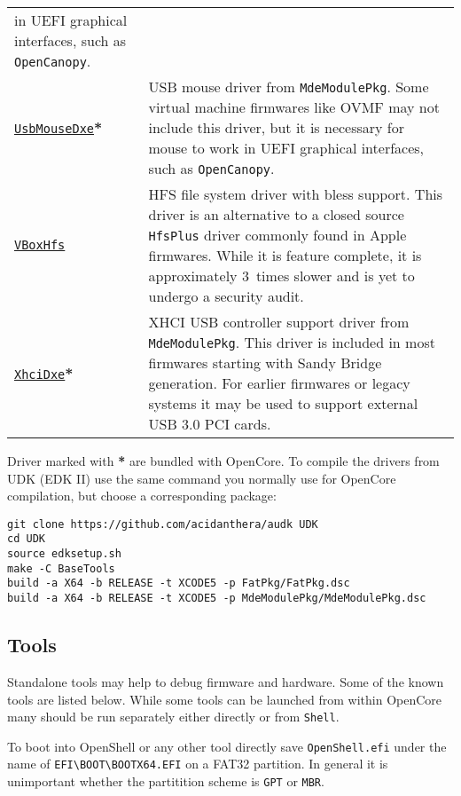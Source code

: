 \documentclass[]{article}
\begin{document}
\begin{tabular}{p{1.3in}p{5.55in}}
  in UEFI graphical interfaces, such as \texttt{OpenCanopy}. \\
  \href{https://github.com/acidanthera/audk}{\texttt{UsbMouseDxe}}\textbf{*}
& USB mouse driver from \texttt{MdeModulePkg}. Some virtual machine firmwares
  like OVMF may not include this driver, but it is necessary for mouse to work
  in UEFI graphical interfaces, such as \texttt{OpenCanopy}. \\
\href{https://github.com/acidanthera/OpenCorePkg}{\texttt{VBoxHfs}}
& HFS file system driver with bless support. This driver is an alternative to
  a closed source \texttt{HfsPlus} driver commonly found in Apple firmwares. While
  it is feature complete, it is approximately 3~times slower and is yet to undergo
  a security audit. \\
\href{https://github.com/acidanthera/audk}{\texttt{XhciDxe}}\textbf{*}
& XHCI USB controller support driver from \texttt{MdeModulePkg}. This driver is
  included in most firmwares starting with Sandy Bridge generation. For earlier firmwares
  or legacy systems it may be used to support external USB 3.0 PCI cards.
\end{tabular}

Driver marked with \textbf{*} are bundled with OpenCore.
To compile the drivers from UDK (EDK II) use the same command you normally use
for OpenCore compilation, but choose a corresponding package:
\begin{lstlisting}[label=compileudk, style=ocbash]
git clone https://github.com/acidanthera/audk UDK
cd UDK
source edksetup.sh
make -C BaseTools
build -a X64 -b RELEASE -t XCODE5 -p FatPkg/FatPkg.dsc
build -a X64 -b RELEASE -t XCODE5 -p MdeModulePkg/MdeModulePkg.dsc
\end{lstlisting}

\subsection{Tools}\label{uefitools}

Standalone tools may help to debug firmware and hardware. Some of the known tools are listed below.
While some tools can be launched from within OpenCore many should be run separately either directly
or from \texttt{Shell}.

To boot into OpenShell or any other tool directly save \texttt{OpenShell.efi}
under the name of \texttt{EFI\textbackslash BOOT\textbackslash BOOTX64.EFI}
on a FAT32 partition. In general it is unimportant whether the partitition scheme
is \texttt{GPT} or \texttt{MBR}.
\end{document}
